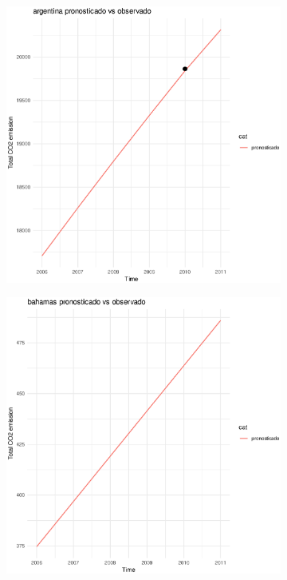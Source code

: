\documentclass[twocolumn]{article}
\begin{document}
    


    \begin{figure}
        
        \begin{subfigure}{.3\textwidth}
            \includegraphics[width=\linewidth]{images/argentina_imputation.eps}
        \end{subfigure}
        \hspace*{\fill}
        \begin{subfigure}{.3\textwidth}
            \includegraphics[width=\linewidth]{images/bahamas_imputation.eps}

\end{subfigure}
\end{figure}
\end{document}
